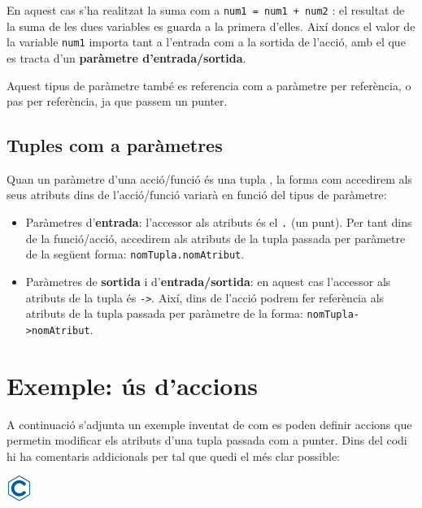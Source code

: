\documentclass[
]{book}
\providecommand{\tightlist}{%
  \setlength{\itemsep}{0pt}\setlength{\parskip}{0pt}}
\begin{document}
En aquest cas s'ha realitzat la suma com a \texttt{num1\ =\ num1\ +\ num2} : el resultat de la suma de les dues variables es guarda a la primera d'elles. Així doncs el valor de la variable \texttt{num1} importa tant a l'entrada com a la sortida de l'acció, amb el que es tracta d'un \textbf{paràmetre d'entrada/sortida}.

Aquest tipus de paràmetre també es referencia com a paràmetre per referència, o pas per referència, ja que passem un punter.

\hypertarget{tuples-com-a-paruxe0metres}{%
\subsection{Tuples com a paràmetres}\label{tuples-com-a-paruxe0metres}}

Quan un paràmetre d'una acció/funció és una tupla , la forma com accedirem als seus atributs dins de l'acció/funció variarà en funció del tipus de paràmetre:

\begin{itemize}
\tightlist
\item
  Paràmetres d'\textbf{entrada}: l'accessor als atributs és el \texttt{.} (un punt). Per tant dins de la funció/acció, accedirem als atributs de la tupla passada per paràmetre de la següent forma: \texttt{nomTupla.nomAtribut}.
\item
  Paràmetres de \textbf{sortida} i d'\textbf{entrada/sortida}: en aquest cas l'accessor als atributs de la tupla és \texttt{-\textgreater{}}. Així, dins de l'acció podrem fer referència als atributs de la tupla passada per paràmetre de la forma: \texttt{nomTupla-\textgreater{}nomAtribut}.
\end{itemize}

\hypertarget{exemple-uxfas-daccions}{%
\section{Exemple: ús d'accions}\label{exemple-uxfas-daccions}}

A continuació s'adjunta un exemple inventat de com es poden definir accions que permetin modificar els atributs d'una tupla passada com a punter. Dins del codi hi ha comentaris addicionals per tal que quedi el més clar possible:

\includegraphics{./img/c.png}
\end{document}
